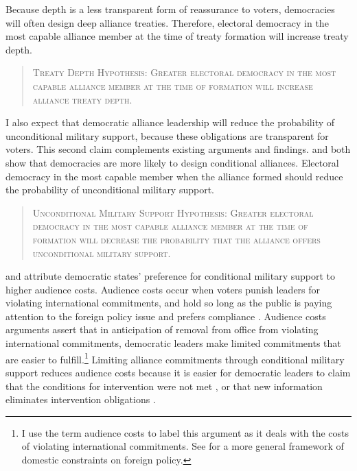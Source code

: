 \documentclass[12pt]{article}
\begin{document}
Because depth is a less transparent form of reassurance to voters, democracies will often design deep alliance treaties. 
Therefore, electoral democracy in the most capable alliance member at the time of treaty formation will increase treaty depth. 


\begin{quote}
\textsc{Treaty Depth Hypothesis: Greater electoral democracy in the most capable alliance member at the time of formation will increase alliance treaty depth.}
\end{quote}   


I also expect that democratic alliance leadership will reduce the probability of unconditional military support, because these obligations are transparent for voters. 
This second claim complements existing arguments and findings. 
\citet{Mattes2012} and \citet{Chibaetal2015} both show that democracies are more likely to design conditional alliances. 
Electoral democracy in the most capable member when the alliance formed should reduce the probability of unconditional military support.


\begin{quote}
\textsc{Unconditional Military Support Hypothesis: Greater electoral democracy in the most capable alliance member at the time of formation will decrease the probability that the alliance offers unconditional military support.}
\end{quote} 


\citet{Mattes2012} and \citet{Chibaetal2015} attribute democratic states' preference for conditional military support to higher audience costs. 
Audience costs occur when voters punish leaders for violating international commitments, and hold so long as the public is paying attention to the foreign policy issue \citep{Slantchev2006, PotterBaum2014} and prefers compliance \citep{Chaudoin2014, KertzerBrutger2016}.  
Audience costs arguments assert that in anticipation of removal from office from violating international commitments, democratic leaders make limited commitments that are easier to fulfill.\footnote{I use the term audience costs to label this argument as it deals with the costs of violating international commitments. See \citet{HydeSaunders2020} for a more general framework of domestic constraints on foreign policy.} 
Limiting alliance commitments through conditional military support reduces audience costs because it is easier for democratic leaders to claim that the conditions for intervention were not met \citep{FjelstulReiter2019}, or that new information eliminates intervention obligations \citep{LevenduskyHorowitz2012}. 
\end{document}
